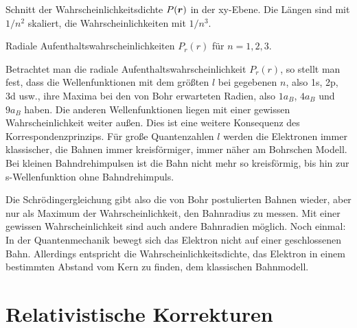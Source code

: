 \begin{marginfigure}
    \caption{Schnitt der Wahrscheinlichkeitsdichte $P(\boldsymbol{r})$ in der xy-Ebene. Die Längen sind mit $1/n^2$ skaliert, die Wahrscheinlichkeiten mit $1/n^3$.}
\end{marginfigure}

\begin{marginfigure}
    \caption{Radiale Aufenthaltswahrscheinlichkeiten  $P_r(r)$ für $n=1,2,3$.}
\end{marginfigure}

Betrachtet man die radiale Aufenthaltswahrscheinlichkeit $P_r(r)$, so stellt man fest, dass die Wellenfunktionen mit dem größten $l$ bei gegebenen $n$, also 1s, 2p, 3d usw., ihre Maxima bei den von Bohr erwarteten Radien, also $1 a_B$, $4 a_B$ und $9 a_B$ haben. Die anderen Wellenfunktionen liegen mit einer gewissen Wahrscheinlichkeit weiter außen. Dies ist eine weitere Konsequenz des Korrespondenzprinzips. Für große Quantenzahlen $l$ werden die Elektronen immer klassischer, die Bahnen immer kreisförmiger, immer näher am Bohrschen Modell. Bei kleinen Bahndrehimpulsen ist die Bahn nicht mehr so kreisförmig, bis hin zur s-Wellenfunktion ohne Bahndrehimpuls.

Die Schrödingergleichung gibt also die von Bohr postulierten Bahnen wieder, aber nur als Maximum der Wahrscheinlichkeit, den Bahnradius zu messen. Mit einer gewissen Wahrscheinlichkeit sind auch andere Bahnradien möglich. Noch einmal: In der Quantenmechanik bewegt sich das Elektron nicht auf einer geschlossenen Bahn. Allerdings entspricht die Wahrscheinlichkeitsdichte, das Elektron in einem bestimmten Abstand vom Kern zu finden, dem klassischen Bahnmodell.



\section{Relativistische Korrekturen}


